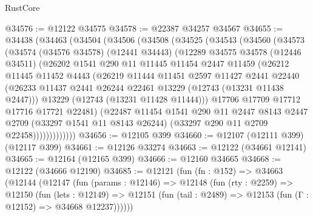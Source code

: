 \begin{lexlean}{RustCore}
\begin{coremodule}
@34576 := @12122 @34575
@34578 := @22387 @34257 @34567
@34655 := @34438
    (@34463
      (@34504
        (@34506
          (@34508
            (@34525
              (@34543
                (@34560
                  (@34573
                    (@34574
                      (@34576 @34578)
                      (@12441 @34443)
                      (@12289
                        @34575
                        @34578
                        (@12446 @34511)
                        (@26202
                          @1541
                          @290
                          @11
                          @11445
                          @11454
                          @2447
                          @11459
                          (@26212
                            @11445
                            @11452
                            @4443
                            (@26219
                              @11444
                              @11451
                              @2597
                              @11427
                              @2441
                              @22440
                              (@26233
                                @11437
                                @2441
                                @26244
                                @22461
                                @13229
                                (@12743 (@13231 @11438 @2447)))
                              @13229
                              (@12743 (@13231 @11428 @11444)))
                            @17706
                            @17709
                            @17712
                            @17716
                            @17721
                            @22481)
                          (@22487
                            @11454
                            @1541
                            @290
                            @11
                            @2447
                            @8143
                            @2447
                            @2709
                            (@33297 @1541 @11 @8143 @26244)
                            (@33297 @290 @11 @2709 @22458)))))))))))))
@34656 := @12105 @399
@34660 := @12107 (@12111 @399) (@12117 @399)
@34661 := @12126 @33274
@34663 := @12122 (@34661 @12141)
@34665 := @12164 (@12165 @399)
@34666 := @12160 @34665
@34668 := @12122 (@34666 @12190)
@34685 := @12121
    (fun (fn : @152) =>
    @34663
      (@12144
        (@12147
          (fun (params : @12146) =>
          @12148
            (fun (rty : @2259) =>
            @12150
              (fun (lets : @12149) =>
              @12151 (fun (tail : @2489) => @12153 (fun (Γ : @12152) => @34668 @12237))))))

\end{coremodule}
\end{lexlean}
